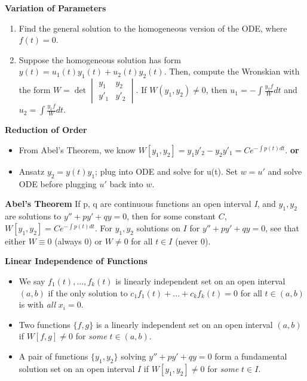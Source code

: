 \documentclass[8pt,letterpaper,boxed]{hmcpset}
\begin{document}
\textbf{Variation of Parameters}
\begin{enumerate}
    \item Find the general solution to the homogeneous version of the ODE, where $f(t) = 0$.
    \item Suppose the homogeneous solution has form $y(t) = u_1(t)y_1(t)+u_2(t)y_2(t)$. Then, compute the Wronskian with the form $W = \det {\begin{vmatrix}y_1&y_2\\y'_1&y'_2 \end{vmatrix}}$. If $W(y_1, y_2) \neq 0$, then $u_1 = -\int \frac{y_2f}{W} dt$ and $u_2 = \int \frac{y_1f}{W} dt$.
\end{enumerate}

\textbf{Reduction of Order}
\begin{itemize}
    \item From Abel's Theorem, we know $W[y_1, y_2] = y_1y'_2-y_2y'_1 = Ce^{-\int p(t) dt}$. \textbf{or}
    \item Ansatz $y_2 = y(t)y_1$; plug into ODE and solve for u(t). Set $w = u'$ and solve ODE before plugging $u'$ back into $w$.
\end{itemize}

\textbf{Abel's Theorem}
If p, q are continuous functions an open interval \textit{I}, and $y_1, y_2$ are solutions to $y'' + py' + qy = 0$, then for some constant $C$, $W[y_1, y_2] = Ce^{-\int p(t) dt}$. For $y_1, y_2$ solutions on $I$ for $y''+py'+qy=0$, see that either $W \equiv 0$ (always 0) or $W \neq 0$ for all $t \in I$ (never 0).

\textbf{Linear Independence of Functions}
\begin{itemize}
    \item We say {$f_1(t),...,f_k(t)$} is linearly independent set on an open interval $(a, b)$ if the only solution to $c_1f_1(t) + ... + c_kf_k(t) = 0$ for all $t \in (a, b)$ is with \textit{all} $x_i = 0$.
    \item Two functions $\{f, g\}$ is a linearly independent set on an open interval $(a, b)$ if $W[f, g] \neq 0$ for \textit{some} $t \in (a, b)$.
    \item A pair of functions $\{y_1, y_2\}$ solving $y'' + py' + qy = 0$ form a fundamental solution set on an open interval $I$ if $W[y_1, y_2] \neq 0$ for \textit{some} $t \in I$.
\end{itemize}
\end{document}
